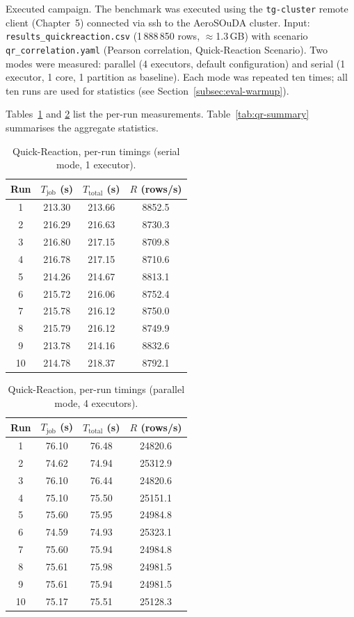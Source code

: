 Executed campaign.
The benchmark was executed using the \texttt{tg-cluster} remote client
(Chapter~5) connected via \gls{ssh} to the AeroSOuDA cluster.
Input: \texttt{results\_quickreaction.csv} (1\,888\,850 rows, $\approx$1.3\,GB) with
scenario \texttt{qr\_correlation.yaml} (Pearson correlation, Quick-Reaction Scenario).
Two modes were measured: parallel (4 executors, default configuration) and
serial (1 executor, 1 core, 1 partition as baseline).  Each mode was repeated
ten times; all ten runs are used for statistics (see Section~\ref{subsec:eval-warmup}).

Tables~\ref{tab:qr-serial-runs} and \ref{tab:qr-parallel-runs} list the per-run
measurements.  Table~\ref{tab:qr-summary} summarises the aggregate statistics.

\begin{table}[htbp]
\centering
\caption{Quick-Reaction, per-run timings (serial mode, 1 executor).}
\label{tab:qr-serial-runs}
\begin{tabular}{cccc}
\toprule
Run & $T_{\text{job}}$ (s) & $T_{\text{total}}$ (s) & $R$ (rows/s) \\
\midrule
1  & 213.30 & 213.66 &  8852.5 \\
2  & 216.29 & 216.63 &  8730.3 \\
3  & 216.80 & 217.15 &  8709.8 \\
4  & 216.78 & 217.15 &  8710.6 \\
5  & 214.26 & 214.67 &  8813.1 \\
6  & 215.72 & 216.06 &  8752.4 \\
7  & 215.78 & 216.12 &  8750.0 \\
8  & 215.79 & 216.12 &  8749.9 \\
9  & 213.78 & 214.16 &  8832.6 \\
10 & 214.78 & 218.37 &  8792.1 \\
\bottomrule
\end{tabular}
\end{table}

\begin{table}[htbp]
\centering
\caption{Quick-Reaction, per-run timings (parallel mode, 4 executors).}
\label{tab:qr-parallel-runs}
\begin{tabular}{cccc}
\toprule
Run & $T_{\text{job}}$ (s) & $T_{\text{total}}$ (s) & $R$ (rows/s) \\
\midrule
1  & 76.10 & 76.48 & 24820.6 \\
2  & 74.62 & 74.94 & 25312.9 \\
3  & 76.10 & 76.44 & 24820.6 \\
4  & 75.10 & 75.50 & 25151.1 \\
5  & 75.60 & 75.95 & 24984.8 \\
6  & 74.59 & 74.93 & 25323.1 \\
7  & 75.60 & 75.94 & 24984.8 \\
8  & 75.61 & 75.98 & 24981.5 \\
9  & 75.61 & 75.94 & 24981.5 \\
10 & 75.17 & 75.51 & 25128.3 \\
\bottomrule
\end{tabular}
\end{table}

